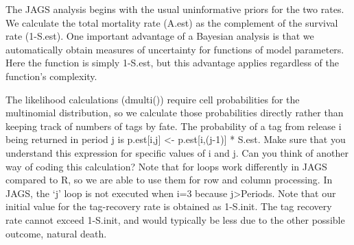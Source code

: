 \documentclass[
]{krantz}
\makeatletter
\newenvironment{Shaded}{\begin{snugshade}}{\end{snugshade}}
\newcommand{\AttributeTok}[1]{\textcolor[rgb]{0.27,0.27,0.27}{#1}}
\newcommand{\CommentTok}[1]{\textcolor[rgb]{0.37,0.37,0.37}{\textit{#1}}}
\newcommand{\DecValTok}[1]{\textcolor[rgb]{0.06,0.06,0.06}{#1}}
\newcommand{\FunctionTok}[1]{\textcolor[rgb]{0.27,0.27,0.27}{\textbf{#1}}}
\newcommand{\NormalTok}[1]{#1}
\newcommand{\OtherTok}[1]{\textcolor[rgb]{0.37,0.37,0.37}{#1}}
\newcommand{\SpecialCharTok}[1]{\textcolor[rgb]{0.43,0.43,0.43}{\textbf{#1}}}
\newcommand{\StringTok}[1]{\textcolor[rgb]{0.5,0.5,0.5}{#1}}
\newenvironment{kframe}{%
\medskip{}
\setlength{\fboxsep}{.8em}
 \def\at@end@of@kframe{}%
 \ifinner\ifhmode%
  \def\at@end@of@kframe{\end{minipage}}%
  \begin{minipage}{\columnwidth}%
 \fi\fi%
 \def\FrameCommand##1{\hskip\@totalleftmargin \hskip-\fboxsep
 \colorbox{shadecolor}{##1}\hskip-\fboxsep
     \hskip-\linewidth \hskip-\@totalleftmargin \hskip\columnwidth}%
 \MakeFramed {\advance\hsize-\width
   \@totalleftmargin\z@ \linewidth\hsize
   \@setminipage}}%
 {\par\unskip\endMakeFramed%
 \at@end@of@kframe}
\renewenvironment{Shaded}{\begin{kframe}}{\end{kframe}}
\makeatother
\begin{document}
\begin{Shaded}
\end{Shaded}

The JAGS analysis begins with the usual uninformative priors for the two rates. We calculate the total mortality rate (A.est) as the complement of the survival rate (1-S.est). One important advantage of a Bayesian analysis is that we automatically obtain measures of uncertainty for functions of model parameters. Here the function is simply 1-S.est, but this advantage applies regardless of the function's complexity.

The likelihood calculations (dmulti()) require cell probabilities for the multinomial distribution, so we calculate those probabilities directly rather than keeping track of numbers of tags by fate. The probability of a tag from release i being returned in period j is p.est{[}i,j{]} \textless- p.est{[}i,(j-1){]} * S.est. Make sure that you understand this expression for specific values of i and j. Can you think of another way of coding this calculation? Note that for loops work differently in JAGS compared to R, so we are able to use them for row and column processing. In JAGS, the `j' loop is not executed when i=3 because j\textgreater Periods. Note that our initial value for the tag-recovery rate is obtained as 1-S.init. The tag recovery rate cannot exceed 1-S.init, and would typically be less due to the other possible outcome, natural death.
\end{document}

